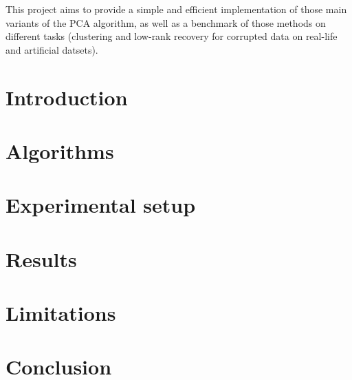 \documentclass[sigconf]{acmart}
\begin{document}
This project aims to provide a simple and efficient implementation of those main variants of the PCA algorithm, as well as a benchmark of those methods on different tasks (clustering and low-rank recovery for corrupted data on real-life and artificial datsets).


\section{Introduction}




\section{Algorithms}




\section{Experimental setup}




\section{Results}




\section{Limitations}




\section{Conclusion}






\end{document}
